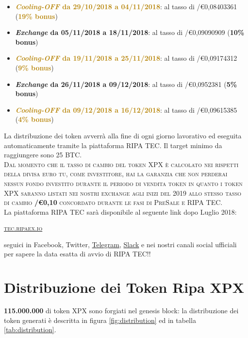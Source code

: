 \begin{itemize}
	\item \textcolor{darkgoldenrod}{\textbf{\textit{Cooling-OFF} da 29/10/2018 a 04/11/2018}}: 
	al tasso di \PHP/\euro0,08403361 (\textcolor{darkgoldenrod}{\textbf{19\% bonus}})
	\item \textcolor{airforceblue}{\textbf{\textit{Exchange} da 05/11/2018 a 18/11/2018}}: al tasso di \PHP/\euro0,09090909 (\textcolor{airforceblue}{\textbf{10\% bonus}})
	\item \textcolor{darkgoldenrod}{\textbf{\textit{Cooling-OFF} da 19/11/2018 a 25/11/2018}}: 
	al tasso di \PHP/\euro0,09174312 (\textcolor{darkgoldenrod}{\textbf{9\% bonus}})
	\item \textcolor{airforceblue}{\textbf{\textit{Exchange} da 26/11/2018 a 09/12/2018}}: al tasso di \PHP/\euro0,0952381 (\textcolor{airforceblue}{\textbf{5\% bonus}})
	\item \textcolor{darkgoldenrod}{\textbf{\textit{Cooling-OFF} da 09/12/2018 a 16/12/2018}}: 
	al tasso di \PHP/\euro0,09615385 (\textcolor{darkgoldenrod}{\textbf{4\% bonus}})
\end{itemize}
\vspace{5mm}
La distribuzione dei token avverrà alla fine di ogni giorno lavorativo ed eseguita automaticamente
tramite la piattaforma RIPA TEC. Il target minimo da raggiungere sono 25 BTC.\\

\textsc{Dal momento che il tasso di cambio del token XPX è calcolato nei rispetti della divisa euro tu, come investitore,
hai la garanzia che non perderai nessun fondo investito durante il periodo di vendita token in quanto i token XPX
saranno listati nei nostri exchange agli inizi del 2019 allo stesso tasso di cambio \textbf{\PHP/\euro0,10} 
concordato durante le fasi di PreSale e RIPA TEC}.\\

La piattaforma RIPA TEC sarà disponibile al seguente link dopo Luglio 2018:
\begin{center}
	\href{https://tec.ripaex.io}{\textsc{tec.ripaex.io}}
\end{center}
seguici in Facebook, Twitter, 
\href{https://t.me/ripaex}{Telegram}, 
\href{https://join.slack.com/t/ripaex/shared_invite/enQtMzM4NzUwNjU4OTQ0LTY3MDJmMTdhYTNlZjJlNGUxNzM1YjUwYjgyYjZlMDJmOTg3NTIzNThmNTYyMGQ3ODBkOTRmYzk3Y2Y4MzBkOTY}{Slack}
e nei nostri canali social ufficiali per sapere la data esatta di avvio di
RIPA TEC!!

\section{Distribuzione dei Token Ripa XPX}
\textbf{115.000.000} di token XPX sono forgiati nel genesis block: la distribuzione dei token generati è descritta
in figura \ref{fig:distribution} ed in tabella \ref{tab:distribution}.

